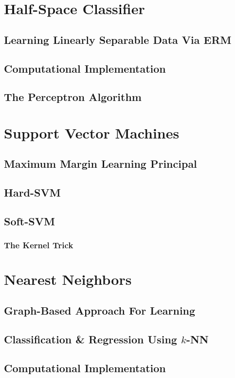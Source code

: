     \section{Half-Space Classifier}
        \subsection{Learning Linearly Separable Data Via ERM}
        \subsection{Computational Implementation}
        \subsection{The Perceptron Algorithm}
        
    \section{Support Vector Machines}
        \subsection{Maximum Margin Learning Principal}
        \subsection{Hard-SVM}
        \subsection{Soft-SVM}
            \subsubsection{The Kernel Trick}
        
    \section{Nearest Neighbors}
        \subsection{Graph-Based Approach For Learning}
        \subsection{Classification \& Regression Using $k$-NN}
        \subsection{Computational Implementation}
